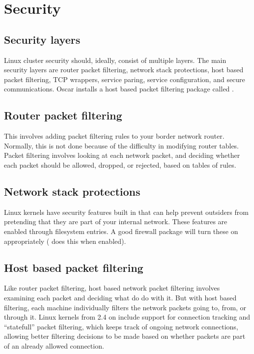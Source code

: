 %
%
%

\section{Security}
\label{app:security}

\subsection{Security layers}
Linux cluster security should, ideally, consist of multiple layers.
The main security layers are router packet filtering, network stack
protections, host based packet filtering, TCP wrappers, service
paring, service configuration, and secure communications.  Oscar
installs a host based packet filtering package called
.

\subsection{Router packet filtering}

This involves adding packet filtering rules to your border network
router.  Normally, this is not done because of the difficulty in
modifying router tables. Packet filtering involves looking at each
network packet, and deciding whether each packet should be allowed,
dropped, or rejected, based on tables of rules.

\subsection{Network stack protections}

Linux kernels have security features built in that can help prevent
outsiders from pretending that they are part of your internal network.
These features are enabled through  filesystem entries.  A
good firewall package will turn these on appropriately
( does this when enabled).

\subsection{Host based packet filtering}

Like router packet filtering, host based network packet filtering
involves examining each packet and deciding what do do with it.  But
with host based filtering, each machine individually filters the
network packets going to, from, or through it.  Linux kernels from 2.4
on include support for connection tracking and ``statefull'' packet
filtering, which keeps track of ongoing network connections, allowing
better filtering decisions to be made based on whether packets are
part of an already allowed connection.

